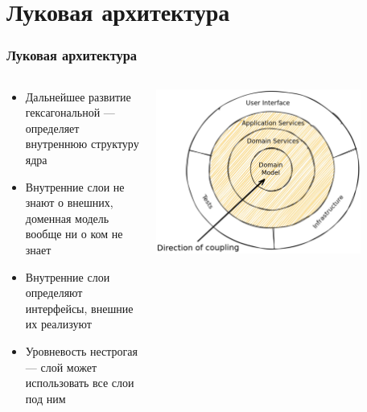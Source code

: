 \documentclass{../../slides-style}
\begin{document}
    \section{Луковая архитектура}

    \begin{frame}
        \frametitle{Луковая архитектура}
        \begin{columns}
            \begin{column}{0.5\textwidth}
                \begin{itemize}
                    \item Дальнейшее развитие гексагональной --- определяет внутреннюю структуру ядра
                    \item Внутренние слои не знают о внешних, доменная модель вообще ни о ком не знает
                    \item Внутренние слои определяют интерфейсы, внешние их реализуют
                    \item Уровневость нестрогая --- слой может использовать все слои под ним
                \end{itemize}
            \end{column}
            \begin{column}{0.5\textwidth}
                \begin{center}
                    \includegraphics[width=0.8\textwidth]{onionArchitecture.png}
                \end{center}
            \end{column}
        \end{columns}
    \end{frame}
\end{document}
